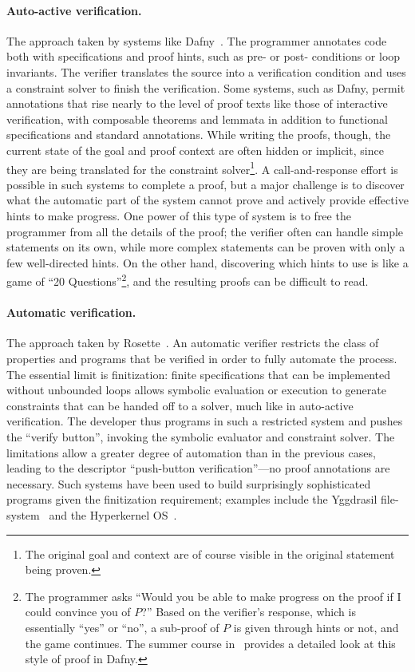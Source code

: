 \paragraph{Auto-active verification.} The approach taken by systems like
Dafny~\cite{leino2010dafny}. The programmer annotates code both with
specifications and proof hints, such as pre- or post- conditions or loop
invariants. The verifier translates the source into a verification condition and
uses a constraint solver to finish the verification. Some systems, such as
Dafny, permit annotations that rise nearly to the level of proof texts like
those of interactive verification, with composable theorems and lemmata in
addition to functional specifications and standard annotations. While writing
the proofs, though, the current state of the  goal and proof context are often
hidden or implicit, since they are being translated for the constraint
solver\footnote{The original goal and context are of course visible in the
original statement being proven.}. A call-and-response effort is possible in
such systems to complete a proof, but a major challenge is to discover what the
automatic part of the system cannot prove and actively provide effective hints
to make progress. One power of this type of system is to free the programmer
from all the details of the proof; the verifier often can handle simple
statements on its own, while more complex statements can be proven with only a
few well-directed hints. On the other hand, discovering which hints to use is
like a game of ``20 Questions''\footnote{The programmer asks ``Would you be
able to make progress on the proof if I could convince you of \(P\)?'' Based on
the verifier's response, which is essentially ``yes'' or ``no'', a sub-proof of
\(P\) is given through hints or not, and the game continues. The summer course
in~\cite{Kapritsos_2020} provides a detailed look at this style of proof in
Dafny.}, and the resulting proofs can be difficult to read.

\paragraph{Automatic verification.} The approach taken by
Rosette~\cite{Torlak_2013}. An automatic verifier restricts the class of
properties and programs that be verified in order to fully automate the process.
The essential limit is finitization: finite specifications that can be
implemented without unbounded loops allows symbolic evaluation or execution to
generate constraints that can be handed off to a solver, much like in
auto-active verification. The developer thus programs in such a restricted
system and pushes the ``verify button'', invoking the symbolic evaluator and
constraint solver. The limitations allow a greater degree of automation than in
the previous cases, leading to the descriptor ``push-button verification''---no
proof annotations are necessary. Such systems have been used to build
surprisingly sophisticated programs given the finitization requirement; examples
include the Yggdrasil file-system~\cite{Sigurbjarnarson_2016} and the
Hyperkernel OS~\cite{Nelson_2017}.

